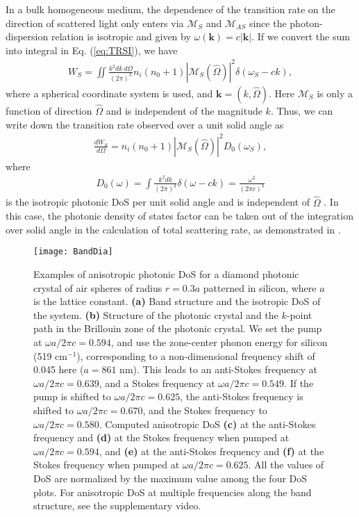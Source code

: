 \documentclass[%
 reprint,
superscriptaddress,
 amsmath,amssymb,
 aps,
pra,
]{revtex4-1}
\newcommand{\mb}[1]{\mathbf{#1}} %
\begin{document}
In a bulk homogeneous medium, the dependence of the transition rate on the direction of scattered light only enters via $\mathcal{M}_{S}$ and $\mathcal{M}_{AS}$ since the photon-dispersion relation is isotropic and given by $\omega(\mb{k})=c|\mb{k}|$. If we convert the sum into integral in Eq. (\ref{eq:TRSI}), we have
\begin{align}\label{eq:TRSIInt}
W_{S}= \iint \frac{k^2dk \  d\Omega}{(2\pi)^3} n_i (n_0+1)|\mathcal{M}_{S}(\hat{\Omega})|^2 \delta(\omega_S-ck),
\end{align}
where a spherical coordinate system is used, and $\mb{k}=(k,\hat{\Omega})$. Here $\mathcal{M}_{S}$ is only a function of direction $\hat{\Omega}$ and is independent of the magnitude $k$. Thus, we can write down the transition rate observed over a unit solid angle as
\begin{align}
\frac{dW_{S}}{d\Omega}=n_i (n_0+1)|\mathcal{M}_{S}(\hat{\Omega})|^2 D_0(\omega_S),
\end{align}
where
\begin{align}\label{eq:IsoDoS}
D_0(\omega)=\int \frac{k^2dk}{(2\pi)^3}  \delta(\omega-ck)=\frac{\omega^2}{(2\pi c)^3}
\end{align}
is the isotropic photonic DoS per unit solid angle and is independent of $\hat{\Omega}$ \cite{gaponenko2002effects}. In this case, the photonic density of states factor can be taken out of the integration over solid angle in the calculation of total scattering rate, as demonstrated in \cite{chen2015raman}. 

\begin{figure*}[!ht]
\begin{center}
\texttt{[image: BandDia]}
\caption{Examples of anisotropic photonic DoS for a diamond photonic crystal of air spheres of radius $r=0.3a$ patterned in silicon, where $a$ is the lattice constant. \textbf{(a)} Band structure and the isotropic DoS of the system. \textbf{(b)} Structure of the photonic crystal and the $k$-point path in the Brillouin zone of the photonic crystal. We set the pump at $\omega a/2\pi c=0.594$, and use the zone-center phonon energy for silicon (519 cm$^{-1}$), corresponding to a non-dimensional frequency shift of 0.045 here ($a=861$ nm). This leads to an anti-Stokes frequency at $\omega a/2\pi c=0.639$, and a Stokes frequency at $\omega a/2\pi c=0.549$. If the pump is shifted to $\omega a/2\pi c=0.625$, the anti-Stokes frequency is shifted to $\omega a/2\pi c=0.670$, and the Stokes frequency to $\omega a/2\pi c=0.580$.  Computed anisotropic DoS \textbf{(c)} at the anti-Stokes frequency and \textbf{(d)} at the Stokes frequency when pumped at $\omega a/2\pi c=0.594$, and \textbf{(e)} at the anti-Stokes frequency and \textbf{(f)} at the Stokes frequency when pumped at $\omega a/2\pi c=0.625$. All the values of DoS are normalized by the maximum value among the four DoS plots. For anisotropic DoS at multiple frequencies along the band structure, see the supplementary video.}
\label{fig:BandDia}
\end{center}
\end{figure*}
\end{document}
